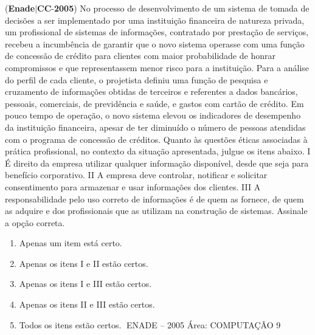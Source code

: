 \documentclass{exam}
\begin{document}
\begin{questions}
\begin{enumerate}[label=\alph*)]
	\end{enumerate}

\question (\textbf{Enade}$|$\textbf{CC}-\textbf{2005}) No processo de desenvolvimento de um sistema de
tomada de decisões a ser implementado por uma
instituição financeira de natureza privada, um profissional
de sistemas de informações, contratado por prestação de
serviços, recebeu a incumbência de garantir que o novo
sistema operasse com uma função de concessão de crédito
para clientes com maior probabilidade de honrar
compromissos e que representassem menor risco para a
instituição. Para a análise do perfil de cada cliente, o
projetista definiu uma função de pesquisa e cruzamento
de informações obtidas de terceiros e referentes a dados
bancários, pessoais, comerciais, de previdência e saúde, e
gastos com cartão de crédito. Em pouco tempo de
operação, o novo sistema elevou os indicadores de
desempenho da instituição financeira, apesar de ter
diminuído o número de pessoas atendidas com o
programa de concessão de créditos.
Quanto às questões éticas associadas à prática profissional, no
contexto da situação apresentada, julgue os itens abaixo.
I É direito da empresa utilizar qualquer informação
disponível, desde que seja para benefício corporativo.
II A empresa deve controlar, notificar e solicitar
consentimento para armazenar e usar informações dos
clientes.
III A responsabilidade pelo uso correto de informações é de
quem as fornece, de quem as adquire e dos profissionais que
as utilizam na construção de sistemas.
Assinale a opção correta.
	\begin{enumerate}[label=\alph*)]
		\item  Apenas um item está certo.
		\item  Apenas os itens I e II estão certos.
		\item  Apenas os itens I e III estão certos.
		\item  Apenas os itens II e III estão certos.
		\item  Todos os itens estão certos.
ENADE – 2005 Área: COMPUTAÇÃO 9

	\end{enumerate}


\end{questions}
\end{document}
